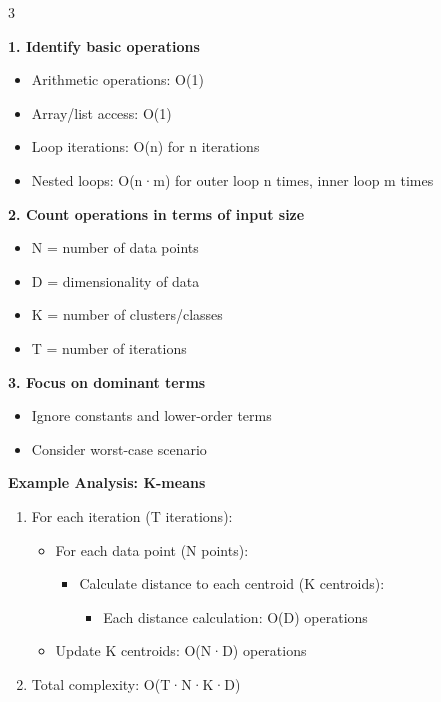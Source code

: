 \documentclass[10pt,landscape]{article}
\begin{document}
\begin{multicols}{3}
\begin{tcolorbox}[breakable, title=Time Complexity Analysis, colback=white,boxsep=1pt,left=1pt,right=1pt,top=1pt,bottom=1pt]
\textbf{1. Identify basic operations}
\begin{itemize}[leftmargin=*,noitemsep,topsep=0pt]
    \item Arithmetic operations: O(1)
    \item Array/list access: O(1)
    \item Loop iterations: O(n) for n iterations
    \item Nested loops: O(n·m) for outer loop n times, inner loop m times
\end{itemize}

\textbf{2. Count operations in terms of input size}
\begin{itemize}[leftmargin=*,noitemsep,topsep=0pt]
    \item N = number of data points
    \item D = dimensionality of data
    \item K = number of clusters/classes
    \item T = number of iterations
\end{itemize}

\textbf{3. Focus on dominant terms}
\begin{itemize}[leftmargin=*,noitemsep,topsep=0pt]
    \item Ignore constants and lower-order terms
    \item Consider worst-case scenario
\end{itemize}

\textbf{Example Analysis: K-means}
\begin{enumerate}[leftmargin=*,noitemsep,topsep=0pt]
    \item For each iteration (T iterations):
    \begin{itemize}[leftmargin=*,noitemsep]
        \item For each data point (N points):
            \begin{itemize}[leftmargin=*,noitemsep]
                \item Calculate distance to each centroid (K centroids):
                    \begin{itemize}[leftmargin=*,noitemsep]
                        \item Each distance calculation: O(D) operations
                    \end{itemize}
            \end{itemize}
        \item Update K centroids: O(N·D) operations
    \end{itemize}
    \item Total complexity: O(T·N·K·D)
\end{enumerate}


\end{tcolorbox}
\end{multicols}
\end{document}
